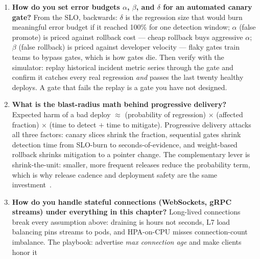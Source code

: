 \begin{enumerate}[label=\textbf{Q\arabic*.}, leftmargin=1.6cm, start=29]
        pages for it at 3~a.m.\ --- a vendor SLA or your team) and
        extensibility trajectory (plugin ecosystems and Wasm beat
        config-file reloads the moment policy gets bespoke). Default
        heuristic: if you will run a mesh within two years, standardize
        on Envoy-flavored everything now; if you need a developer portal
        and monetization, that's gateway-product territory (Kong class);
        if the traffic profile is simple and the team's depth is NGINX,
        boring wins.
  \item \textbf{How do you set error budgets $\alpha$, $\beta$, and
        $\delta$ for an automated canary gate?}
        From the SLO, backwards: $\delta$ is the regression size that
        would burn meaningful error budget if it reached 100\% for one
        detection window; $\alpha$ (false promote) is priced against
        rollback cost --- cheap rollback buys aggressive $\alpha$;
        $\beta$ (false rollback) is priced against developer velocity ---
        flaky gates train teams to bypass gates, which is how gates die.
        Then verify with the simulator: replay historical incident metric
        series through the gate and confirm it catches every real
        regression \emph{and} passes the last twenty healthy deploys.
        A gate that fails the replay is a gate you have not designed.
  \item \textbf{What is the blast-radius math behind progressive
        delivery?}
        Expected harm of a bad deploy $\approx$ (probability of
        regression) $\times$ (affected fraction) $\times$ (time to
        detect $+$ time to mitigate). Progressive delivery attacks all
        three factors: canary slices shrink the fraction, sequential
        gates shrink detection time from SLO-burn to seconds-of-evidence,
        and weight-based rollback shrinks mitigation to a pointer change.
        The complementary lever is shrink-the-unit: smaller, more
        frequent releases reduce the probability term, which is why
        release cadence and deployment safety are the same
        investment~\cite{nygard2018releaseit}.
  \item \textbf{How do you handle stateful connections (WebSockets,
        gRPC streams) under everything in this chapter?}
        Long-lived connections break every assumption above: draining is
        hours not seconds, L7 load balancing pins streams to pods, and
        HPA-on-CPU misses connection-count imbalance. The playbook:
        advertise \emph{max connection age} and make clients honor it

\end{enumerate}

